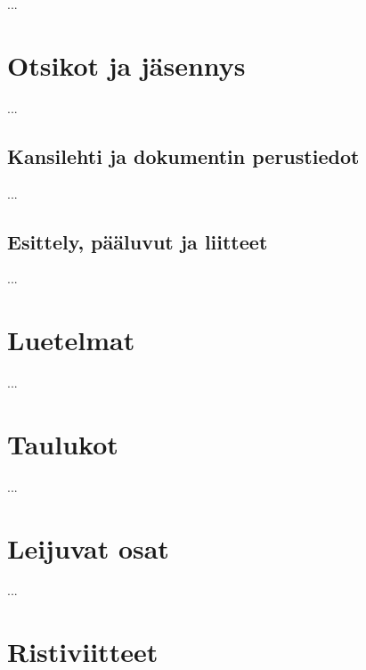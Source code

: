 ...

\section{Otsikot ja jäsennys}
\label{luku:otsikot}


...

\subsection{Kansilehti ja dokumentin perustiedot}
\label{luku:kansilehti}

...

\subsection{Esittely, pääluvut ja liitteet}
\label{luku:frontmainbackmatter}


...

\section{Luetelmat}
\label{luku:luetelmat}

...

\section{Taulukot}
\label{luku:taulukot}

...

\section{Leijuvat osat}
\label{luku:leijuosat}

...

\section{Ristiviitteet}
\label{luku:ristiviitteet}

